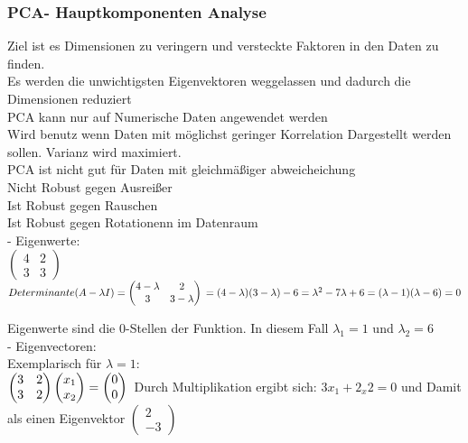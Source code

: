 \documentclass[a4paper]{scrartcl}
\begin{document}
\subsubsection{PCA- Hauptkomponenten Analyse}
Ziel ist es Dimensionen zu veringern und versteckte Faktoren in den Daten zu finden.\\
Es werden die unwichtigsten Eigenvektoren weggelassen und dadurch die Dimensionen reduziert\\ 
PCA kann nur auf Numerische Daten angewendet werden\\
Wird benutz wenn Daten mit möglichst geringer Korrelation Dargestellt werden sollen. Varianz wird maximiert.\\
PCA ist nicht gut für Daten mit gleichmäßiger abweicheichung\\
Nicht Robust gegen Ausreißer\\
Ist Robust gegen Rauschen\\
Ist Robust gegen Rotationenn im Datenraum\\


- Eigenwerte:\\


$\begin{pmatrix} 4 & 2 \\ 3 & 3 \end{pmatrix}$\\
$Determinante(A-\lambda I) = \begin{pmatrix} 4 -\lambda & 2 \\ 3 & 3-\lambda \end{pmatrix}\\
= (4-\lambda)(3-\lambda)-6\\ = \lambda^2 - 7\lambda + 6\\ = (\lambda -1)(\lambda - 6) = 0\\$

Eigenwerte sind die 0-Stellen der Funktion. In diesem Fall $\lambda_1 = 1$ und $\lambda_2 = 6$\\

- Eigenvectoren:\\
Exemplarisch für $\lambda = 1$:\\

$\begin{pmatrix} 3 & 2 \\ 3 & 2 \end{pmatrix} \begin{pmatrix} x_1 \\ x_2 \end{pmatrix} = \begin{pmatrix} 0 \\ 0 \end{pmatrix}\\$
Durch Multiplikation ergibt sich: $ 3x_1 + 2_x2 = 0$ und Damit als einen Eigenvektor $\begin{pmatrix} 2 \\ -3 \end{pmatrix}$\\
\end{document}
